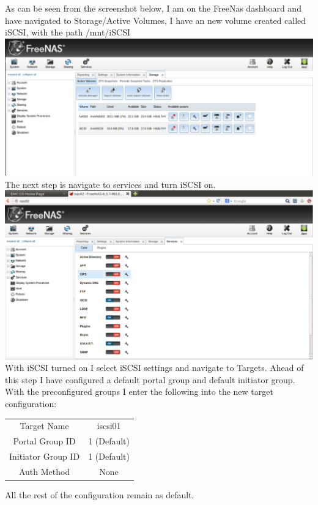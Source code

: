 As can be seen from the screenshot below, I am on the FreeNas dashboard and have navigated to Storage/Active Volumes, I have an new volume created called iSCSI, with the path /mnt/iSCSI
\\\includegraphics[width=\textwidth]{8.png}
\\ The next step is navigate to services and turn iSCSI on.
\\\includegraphics[width=\textwidth]{7.png}
\\ With iSCSI turned on I select iSCSI settings and navigate to Targets. Ahead of this step I have configured a default portal group and default initiator group. With the preconfigured groups I enter the following into the new target configuration:
\begin{center}
\begin{tabular}{ |c|c| } 
 \hline
 Target Name & iscsi01 \\ 
 Portal Group ID & 1 (Default)\\ 
 Initiator Group ID & 1 (Default) \\ 
 Auth Method & None \\
 \hline
\end{tabular}
\end{center}
All the rest of the configuration remain as default.
